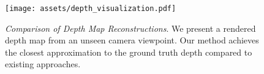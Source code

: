 \begin{figure}[!ht]
    \centering
    \texttt{[image: assets/depth\_visualization.pdf]}
    \vspace{-2em}
    \caption{\textit{Comparison of Depth Map Reconstructions}. 
    We present a rendered depth map from an unseen camera viewpoint.
    Our method achieves the closest approximation to the ground truth depth compared to existing approaches.
    }
    \label{fig:depth}
\end{figure}

